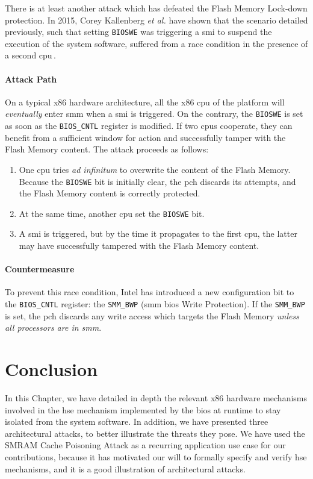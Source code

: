 There is at least another attack which has defeated the Flash Memory Lock-down
protection.
%
In 2015, Corey Kallenberg \emph{et al.} have shown that the scenario detailed
previously, such that setting \texttt{BIOSWE} was triggering a \ac{smi} to
suspend the execution of the system software, suffered from a race condition in
the presence of a second \ac{cpu}\,\cite{kallenberg2015racecondition}.

\paragraph{Attack Path}
%
On a typical x86 hardware architecture, all the x86 \ac{cpu} of the platform
will \emph{eventually} enter \ac{smm} when a \ac{smi} is triggered.
%
On the contrary, the \texttt{BIOSWE} is set as soon as the \texttt{BIOS\_CNTL}
register is modified.
%
If two \acp{cpu} cooperate, they can benefit from a sufficient window for action
and successfully tamper with the Flash Memory content.
%
The attack proceeds as follows:

\begin{enumerate}
\item One \ac{cpu} tries \emph{ad infinitum} to overwrite the content of the
  Flash Memory. Because the \texttt{BIOSWE} bit is initially clear, the \ac{pch}
  discards its attempts, and the Flash Memory content is correctly protected.
%
\item At the same time, another \ac{cpu} set the \texttt{BIOSWE} bit.
%
\item A \ac{smi} is triggered, but by the time it propagates to the first
  \ac{cpu}, the latter may have successfully tampered with the Flash Memory
  content.
%
\end{enumerate}

\paragraph{Countermeasure}
%
To prevent this race condition, Intel has introduced a new configuration bit to
the \texttt{BIOS\_CNTL} register: the \texttt{SMM\_BWP} (\ac{smm} \ac{bios}
Write Protection).
%
If the \texttt{SMM\_BWP} is set, the \ac{pch} discards any write access which
targets the Flash Memory \emph{unless all processors are in \ac{smm}}.

\section{Conclusion}
\label{sec:usecase:conclusion}

In this Chapter, we have detailed in depth the relevant x86 hardware mechanisms
involved in the \ac{hse} mechanism implemented by the \ac{bios} at runtime to
stay isolated from the system software.
%
In addition, we have presented three architectural attacks, to better illustrate
the threats they pose.
%
We have used the SMRAM Cache Poisoning Attack as a recurring application use
case for our contributions, because it has motivated our will to formally
specify and verify \ac{hse} mechanisms, and it is a good illustration of
architectural attacks.
